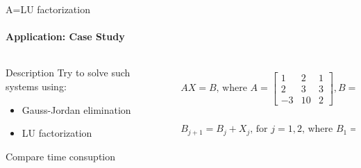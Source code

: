 \documentclass[aspectratio=169]{beamer}
\begin{document}
\begin{frame}[t]{A=LU factorization}
    \framesubtitle{Application: Case Study}
    \vspace{-0.6cm}
    \begin{columns}[T,onlytextwidth]
        \begin{column}{0.49\textwidth}
            \begin{block}{Description}
                Try to solve such systems using:
                \begin{itemize}
                    \item Gauss-Jordan elimination
                    \item LU factorization
                \end{itemize}
                Compare time consuption
            \end{block}
        \end{column}
        \begin{column}{0.49\textwidth}
            \begin{eqnarray*}
                AX=B \text{, where } A = \begin{bmatrix}
                    1  & 2  & 1 \\
                    2  & 3  & 3 \\
                    -3 & 10 & 2
                \end{bmatrix}, B = \begin{bmatrix}
                    k_1 \\k_2\\k_3
                \end{bmatrix} \\
                B_{j+1} = B_j + X_j \text{, for $j=1,2$, where }B_1= \begin{bmatrix}
                    1 \\1\\1
                \end{bmatrix}
            \end{eqnarray*}
        \end{column}
    \end{columns}
    \vspace{-0.8cm}
\end{frame}
\end{document}

